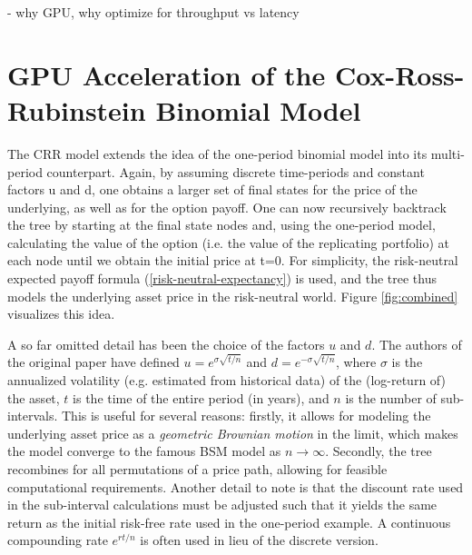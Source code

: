 \documentclass[english,12pt,a4paper,pdftex,sci,utf8]{aaltothesis}
\begin{document}
- why GPU, why optimize for throughput vs latency


\clearpage

\section{GPU Acceleration of the Cox-Ross-Rubinstein Binomial Model} \label{sec:gpu-crr}

The CRR model extends the idea of the one-period binomial model into its multi-period counterpart. Again, by assuming discrete time-periods and constant factors u and d, one obtains a larger set of final states for the price of the underlying, as well as for the option payoff. One can now recursively backtrack the tree by starting at the final state nodes and, using the one-period model, calculating the value of the option (i.e. the value of the replicating portfolio) at each node until we obtain the initial price at t=0. For simplicity, the risk-neutral expected payoff formula (\ref{risk-neutral-expectancy}) is used, and the tree thus models the underlying asset price in the risk-neutral world. Figure \ref{fig:combined} visualizes this idea. \cite{cox1979option}

A so far omitted detail has been the choice of the factors $u$ and $d$. The authors of the original paper have defined $u = e^{\sigma\sqrt{t/n}}$ and $d = e^{-\sigma\sqrt{t/n}}$, where $\sigma$ is the annualized volatility (e.g. estimated from historical data) of the (log-return of) the asset, $t$ is the time of the entire period (in years), and $n$ is the number of sub-intervals. This is useful for several reasons: firstly, it allows for modeling the underlying asset price as a \emph{geometric Brownian motion} in the limit, which makes the model converge to the famous BSM model as $n \rightarrow \infty$. Secondly, the tree recombines for all permutations of a price path, allowing for feasible computational requirements. Another detail to note is that the discount rate used in the sub-interval calculations must be adjusted such that it yields the same return as the initial risk-free rate used in the one-period example. A continuous compounding rate $e^{rt/n}$ is often used in lieu of the discrete version. \cite{cox1979option} \cite{hull2013fundamentals}
\end{document}
